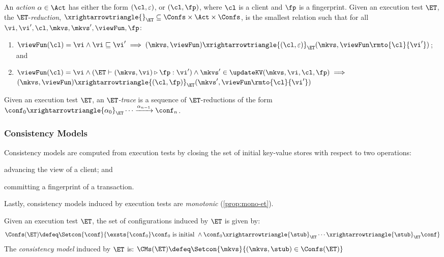 \begin{definition}[$\ET$-reductions]
\label{def:reduction}
An \emph{action} $\alpha \in \Act$ has either the form $(\cl, \varepsilon)$, 
or $(\cl, \fp)$, 
where $\cl$ is a client and $\fp$ is a fingerprint. 
Given an execution test $\ET$, the $\ET$-\emph{reduction}, 
$\xrightarrowtriangle{}_{\ET} \subseteq \Confs \times \Act \times \Confs$, 
is the smallest relation such that for all $\vi, \vi', \cl, \mkvs, \mkvs', \viewFun, \fp$:
\begin{enumerate}
	\item 
    $
    \viewFun(\cl) = \vi 
    \wedge \vi \sqsubseteq \vi' 
    \implies (\mkvs, \viewFun) \xrightarrowtriangle{(\cl, \varepsilon)}_{\ET} 
    (\mkvs, \viewFun\rmto{\cl}{\vi'})$; and
	\item 
    $\viewFun(\cl) = \vi
        \wedge (\ET \vdash (\mkvs, \vi) \triangleright \fp: \vi')  
        \wedge \mkvs' \in \updateKV(\mkvs, \vi, \cl, \fp) \implies
	$  \\
	\phantom{a} \hfill 
	$(\mkvs, \viewFun) \xrightarrowtriangle{(\cl, \fp)}_{\ET} (\mkvs', \viewFun\rmto{\cl}{\vi'})$
\end{enumerate}
%
Given an execution test $\ET$, an \emph{$\ET$-trace} is a sequence of $\ET$-reductions of the form $\conf_{0} \xrightarrowtriangle{\alpha_{0}}_{\ET} \cdots 
\xrightarrow{\alpha_{n-1}} \conf_{n}$.
\end{definition}
%
%
%
%
\subsubsection{Consistency Models}
Consistency models are computed from execution tests by closing the set of initial key-value stores with respect to two operations: 
\begin{enumerate*}[label=(\arabic*)]
	\item advancing the view of a client; and 
	\item committing a fingerprint of a transaction. 
\end{enumerate*}
Lastly, consistency models induced by execution tests are \emph{monotonic} (\cref{prop:mono-et}).
%
%
\begin{definition}
\label{def:cm}
Given an execution test $\ET$, the set of configurations induced by $\ET$ is given by:
\[
\Confs(\ET) \defeq \Setcon{ \conf}{ \exsts{\conf_0} \conf_0 \text{ is initial } \wedge \conf_0 \xrightarrowtriangle{\stub}_{\ET} \cdots \xrightarrowtriangle{\stub}_{\ET} \conf }
\]
The \emph{consistency model} induced by $\ET$ is:
\( 
\CMs(\ET) \defeq \Setcon{ \mkvs }{ (\mkvs, \stub) \in \Confs(\ET) }
\)
\end{definition}





